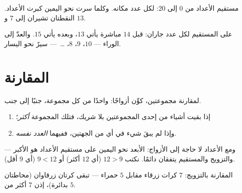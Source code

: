 \begin{omfigure}

{\small مستقيم الأعداد من $0$ إلى $20$: لكل عدد مكانه.
وكلما سرت نحو اليمين كبرت الأعداد. النقطتان تشيران إلى $7$ و $13$.}
\end{omfigure}

\begin{example}\label{ex:g1:counting:neighbors}
على المستقيم لكل عدد جاران: قبل $14$ مباشرة يأتي $13$، وبعده يأتي
$15$. والعدّ إلى الوراء --- $10$، $9$، $8$،
\dots\ --- سيرٌ نحو اليسار.
\end{example}

\section{المقارنة}

\begin{method}\label{met:g1:counting:compare}
لمقارنة مجموعتين، كوِّن أزواجًا: واحدًا من كل مجموعة، جنبًا إلى
جنب.
\begin{enumerate}
  \item إذا بقيت أشياء من إحدى المجموعتين بلا شريك، فتلك المجموعة
        \emph{أكثر}؛
  \item وإذا لم يبقَ شيء في أي من الجهتين، ففيهما
        \emph{العدد نفسه}.
\end{enumerate}
ومع الأعداد لا حاجة إلى الأزواج: الأبعد نحو اليمين على مستقيم
الأعداد هو الأكبر --- والتزويج والمستقيم يتفقان دائمًا. نكتب
$12 > 9$ (أي $12$ أكثر) أو $9 < 12$ (أي $9$ أقل).
\end{method}

\begin{omfigure}

{\small المقارنة بالتزويج: $7$ كرات زرقاء مقابل $5$ حمراء
--- تبقى كرتان زرقاوان (محاطتان بدائرة)، إذن $7$ أكثر من $5$.}
\end{omfigure}

